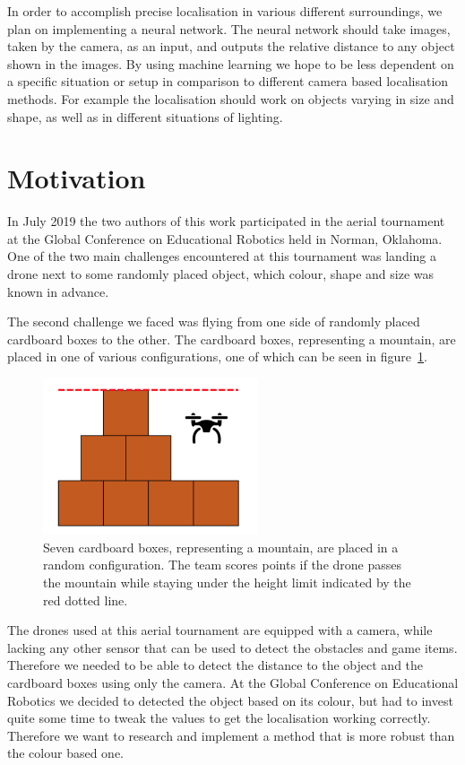 In order to accomplish precise localisation in various different surroundings, we plan on implementing a neural network. The neural network should take images, taken by the camera, as an input, and outputs the relative distance to any object shown in the images. By using machine learning we hope to be less dependent on a specific situation or setup in comparison to different camera based localisation methods. For example the localisation should work on objects varying in size and shape, as well as in different situations of lighting.

\section{Motivation}
In July 2019 the two authors of this work participated in the aerial tournament at the Global Conference on Educational Robotics held in Norman, Oklahoma. One of the two main challenges encountered at this tournament was landing a drone next to some randomly placed object, which colour, shape and size was known in advance.

The second challenge we faced was flying from one side of randomly placed cardboard boxes to the other. The cardboard boxes, representing a mountain, are placed in one of various configurations, one of which can be seen in figure~\ref{pic:introduction_motivation_mountain}.

\begin{figure}[h]
	\centering
	\includegraphics[width=2.5in]{img/introduction_motivation_mountain.png}
	\caption{Seven cardboard boxes, representing a mountain, are placed in a random configuration. The team scores points if the drone passes the mountain while staying under the height limit indicated by the red dotted line.}
	\label{pic:introduction_motivation_mountain}
\end{figure}

The drones used at this aerial tournament are equipped with a camera, while lacking any other sensor that can be used to detect the obstacles and game items. Therefore we needed to be able to detect the distance to the object and the cardboard boxes using only the camera. At the Global Conference on Educational Robotics we decided to detected the object based on its colour, but had to invest quite some time to tweak the values to get the localisation working correctly. Therefore we want to research and implement a method that is more robust than the colour based one.

\filbreak
